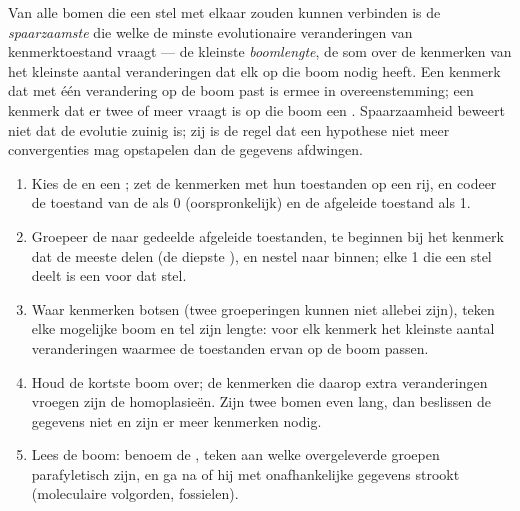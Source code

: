 \begin{definition}[Spaarzaamheid]\label{def:b1:classifying-biodiversity:parsimony}
Van alle bomen die een stel  met elkaar zouden kunnen verbinden is de
\emph{spaarzaamste} die welke de minste evolutionaire veranderingen van
kenmerktoestand vraagt --- de kleinste \emph{boomlengte}, de som over de
kenmerken van het kleinste aantal veranderingen dat elk op die boom nodig
heeft. Een kenmerk dat met één verandering op de boom past is ermee in
overeenstemming; een kenmerk dat er twee of meer vraagt is op die boom een
. Spaarzaamheid beweert niet dat de evolutie zuinig is; zij is de
regel dat een hypothese niet meer convergenties mag opstapelen dan de
gegevens afdwingen.
\end{definition}

\begin{method}\label{met:b1:classifying-biodiversity:cladogram}
\begin{enumerate}
  \item Kies de  en een ; zet de kenmerken met hun
        toestanden op een rij, en codeer de toestand van de 
        als 0 (oorspronkelijk) en de afgeleide toestand als 1.
  \item Groepeer de  naar gedeelde afgeleide toestanden, te beginnen
        bij het kenmerk dat de meeste  delen (de diepste ), en
        nestel naar binnen; elke 1 die een stel  deelt is een
         voor dat stel.
  \item Waar kenmerken botsen (twee groeperingen kunnen niet allebei
         zijn), teken elke mogelijke boom en tel zijn lengte: voor
        elk kenmerk het kleinste aantal veranderingen waarmee de
        toestanden ervan op de boom passen.
  \item Houd de kortste boom over; de kenmerken die daarop extra
        veranderingen vroegen zijn de homoplasieën. Zijn twee bomen even
        lang, dan beslissen de gegevens niet en zijn er meer kenmerken
        nodig.
  \item Lees de boom: benoem de , teken aan welke overgeleverde
        groepen parafyletisch zijn, en ga na of hij met onafhankelijke
        gegevens strookt (moleculaire volgorden, fossielen).
\end{enumerate}
\end{method}

